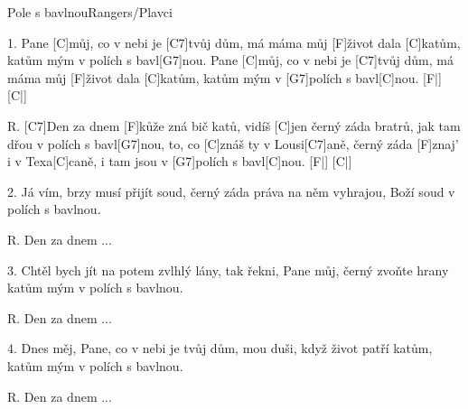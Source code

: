 \begin{song}{Pole s bavlnou}{Rangers/Plavci}

\begin{xverse}{1. }
Pane [C]můj, co v nebi je [C7]tvůj dům,
má máma můj [F]{ži}vot dala [C]katům,
katům mým v polích s bavl[G7]nou.
Pane [C]můj, co v nebi je [C7]tvůj dům,
má máma můj [F]{ži}vot dala [C]katům,
katům mým v [G7]polích s bavl[C]nou. [F|]{} [C|]{}
\end{xverse}

\begin{xverse}{R. }
[C7]Den za dnem [F]kůže zná bič katů,
vidíš [C]jen černý záda bratrů,
jak tam dřou v polích s bavl[G7]nou,
to, co [C]znáš ty v Lousi[C7]aně,
černý záda [F]znaj' i v Texa[C]caně,
i tam jsou v [G7]polích s bavl[C]nou. [F|]{} [C|]{}
\end{xverse}

\begin{xverse}{2. }
Já vím, brzy musí přijít soud,
černý záda práva na něm vyhrajou,
Boží soud v polích s bavlnou.
\end{xverse}

\begin{xverse}{R. }
Den za dnem ...
\end{xverse}

\begin{xverse}{3. }
Chtěl bych jít na potem zvlhlý lány,
tak řekni, Pane můj, černý zvoňte hrany
katům mým v polích s bavlnou.
\end{xverse}

\begin{xverse}{R. }
Den za dnem ...
\end{xverse}

\begin{xverse}{4. }
Dnes měj, Pane, co v nebi je tvůj dům,
mou duši, když život patří katům,
katům mým v polích s bavlnou.
\end{xverse}

\begin{xverse}{R. }
Den za dnem ...
\end{xverse}

\end{song}

